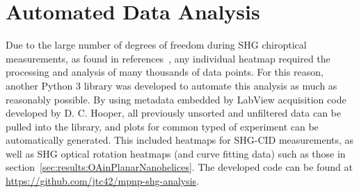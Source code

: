 \section{Automated Data Analysis}\label{sec:appendix:pyshg}
Due to the large number of degrees of freedom during SHG chiroptical measurements, as found in references~\cite{Collins2018b, Hooper2017}, any individual heatmap required the processing and analysis of many thousands of data points. For this reason, another Python 3 library was developed to automate this analysis as much as reasonably possible. By using metadata embedded by LabView acquisition code developed by D. C. Hooper, all previously unsorted and unfiltered data can be pulled into the library, and plots for common typed of experiment can be automatically generated. This included heatmaps for SHG-CID measurements, as well as SHG optical rotation heatmaps (and curve fitting data) such as those in section~\ref{sec:results:OAinPlanarNanohelices}.
The developed code can be found at \url{https://github.com/jtc42/mpnp-shg-analysis}.